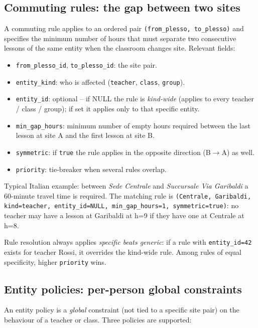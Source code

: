 \subsection{Commuting rules: the gap between two sites}

A commuting rule applies to an ordered pair
\texttt{(from\_plesso, to\_plesso)} and specifies the
minimum number of hours that must separate two consecutive
lessons of the same entity when the classroom changes site.
Relevant fields:

\begin{itemize}
\item \texttt{from\_plesso\_id}, \texttt{to\_plesso\_id}:
the site pair.
\item \texttt{entity\_kind}: who is affected
(\texttt{teacher}, \texttt{class}, \texttt{group}).
\item \texttt{entity\_id}: optional -- if NULL the rule is
\emph{kind-wide} (applies to every teacher / class / group);
if set it applies only to that specific entity.
\item \texttt{min\_gap\_hours}: minimum number of empty
hours required between the last lesson at site A and the
first lesson at site B.
\item \texttt{symmetric}: if \texttt{true} the rule applies
in the opposite direction (B$\to$A) as well.
\item \texttt{priority}: tie-breaker when several rules
overlap.
\end{itemize}

Typical Italian example: between \emph{Sede Centrale} and
\emph{Succursale Via Garibaldi} a 60-minute travel time is
required. The matching rule is
\texttt{(Centrale, Garibaldi, kind=teacher,
entity\_id=NULL, min\_gap\_hours=1, symmetric=true)}: no
teacher may have a lesson at Garibaldi at h=9 if they have
one at Centrale at h=8.

Rule resolution always applies \emph{specific beats
generic}: if a rule with \texttt{entity\_id=42} exists for
teacher Rossi, it overrides the kind-wide rule. Among rules
of equal specificity, higher \texttt{priority} wins.

\subsection{Entity policies: per-person global constraints}

An entity policy is a \emph{global} constraint (not tied to
a specific site pair) on the behaviour of a teacher or
class. Three policies are supported:

